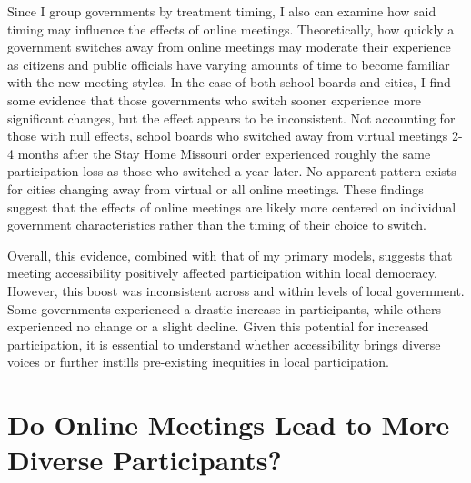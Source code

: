     Since I group governments by treatment timing, I also can examine how said timing may influence the effects of online meetings. Theoretically, how quickly a government switches away from online meetings may moderate their experience as citizens and public officials have varying amounts of time to become familiar with the new meeting styles. In the case of both school boards and cities, I find some evidence that those governments who switch sooner experience more significant changes, but the effect appears to be inconsistent. Not accounting for those with null effects, school boards who switched away from virtual meetings 2-4 months after the Stay Home Missouri order experienced roughly the same participation loss as those who switched a year later. No apparent pattern exists for cities changing away from virtual or all online meetings. These findings suggest that the effects of online meetings are likely more centered on individual government characteristics rather than the timing of their choice to switch.

    Overall, this evidence, combined with that of my primary models, suggests that meeting accessibility positively affected participation within local democracy. However, this boost was inconsistent across and within levels of local government. Some governments experienced a drastic increase in participants, while others experienced no change or a slight decline. Given this potential for increased participation, it is essential to understand whether accessibility brings diverse voices or further instills pre-existing inequities in local participation.

\section{Do Online Meetings Lead to More Diverse Participants?}

